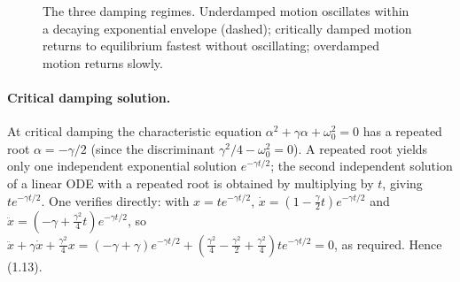 \documentclass{report}
\numberwithin{equation}{section}
\begin{document}
\begin{figure}[H]
\centering
{}
\caption{The three damping regimes. Underdamped motion oscillates within a
decaying exponential envelope (dashed); critically damped motion returns to
equilibrium fastest without oscillating; overdamped motion returns slowly.}
\label{fig:damping_regimes}
\end{figure}

\paragraph{Critical damping solution.}
At critical damping the characteristic equation $\alpha^2+\gamma\alpha+\omega_0^2=0$
has a repeated root $\alpha=-\gamma/2$ (since the discriminant
$\gamma^2/4-\omega_0^2=0$). A repeated root yields only one independent
exponential solution $e^{-\gamma t/2}$; the second independent solution of a
linear ODE with a repeated root is obtained by multiplying by $t$, giving
$te^{-\gamma t/2}$. One verifies directly: with $x=te^{-\gamma t/2}$,
$\dot x=(1-\tfrac{\gamma}{2}t)e^{-\gamma t/2}$ and
$\ddot x=(-\gamma+\tfrac{\gamma^2}{4}t)e^{-\gamma t/2}$, so
$\ddot x+\gamma\dot x+\tfrac{\gamma^2}{4}x
=(-\gamma+\gamma)e^{-\gamma t/2}+(\tfrac{\gamma^2}{4}-\tfrac{\gamma^2}{2}+\tfrac{\gamma^2}{4})te^{-\gamma t/2}=0$,
as required. Hence (1.13).
\end{document}
